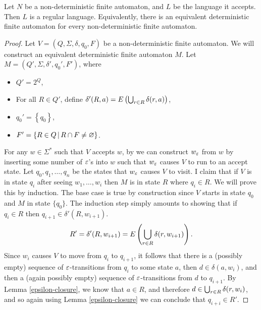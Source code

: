 \begin{thm}\label{dfa-nfa-equivalence}
    Let $N$ be a non-deterministic finite automaton, and $L$ be the language it accepts. Then $L$ is a regular language. Equivalently, there is an equivalent deterministic finite automaton for every non-deterministic finite automaton.
\end{thm}

\begin{proof}
    Let $V = \left(Q, \Sigma, \delta, q_0, F\right)$ be a non-deterministic finite automaton. We will construct an equivalent deterministic finite automaton $M$. Let $M = \left(Q', \Sigma, \delta', q_0', F'\right)$, where
    \begin{itemize}
        \item $Q' = 2^Q$,
        \item For all $R \in Q'$, define $\delta'(R, a) = E\left(\bigcup_{r \in R}\delta(r, a)\right)$,
        \item $q_0' = \left\{q_0\right\}$,
        \item $F' = \left\{R \in Q \,\middle|\, R \cap F \neq \varnothing\right\}$.
    \end{itemize}

    For any $w \in \Sigma^*$ such that $V$ accepts $w$, by we can construct $w_{\varepsilon}$ from $w$ by inserting some number of $\varepsilon$'s into $w$ such that $w_{\varepsilon}$ causes $V$ to run to an accept state. Let $q_0, q_1, \ldots, q_n$ be the states that $w_{\varepsilon}$ causes $V$ to visit. I claim that if $V$ is in state $q_i$ after seeing $w_1, \ldots, w_i$ then $M$ is in state $R$ where $q_i \in R$. We will prove this by induction. The base case is true by construction since $V$ starts in state $q_0$ and $M$ in state $\{q_0\}$. The induction step simply amounts to showing that if $q_i \in R$ then $q_{i+1} \in \delta'(R, w_{i+1})$.
    \begin{align*}
        R' = \delta'(R, w_{i+1}) = E\left(\bigcup_{r\in R}\delta(r, w_{i+1})\right).
    \end{align*}
    Since $w_i$ causes $V$ to move from $q_i$ to $q_{i+1}$, it follows that there is a (possibly empty) sequence of $\varepsilon$-transitions from $q_i$ to some state $a$, then $d \in \delta(a, w_i)$, and then a (again possibly empty) sequence of $\varepsilon$-transitions from $d$ to $q_{i+1}$. By Lemma \ref{epsilon-closure}, we know that $a \in R$, and therefore $d \in \bigcup_{r \in R}\delta(r, w_i)$, and so again using Lemma \ref{epsilon-closure} we can conclude that $q_{i+i} \in R'$.


\end{proof}
